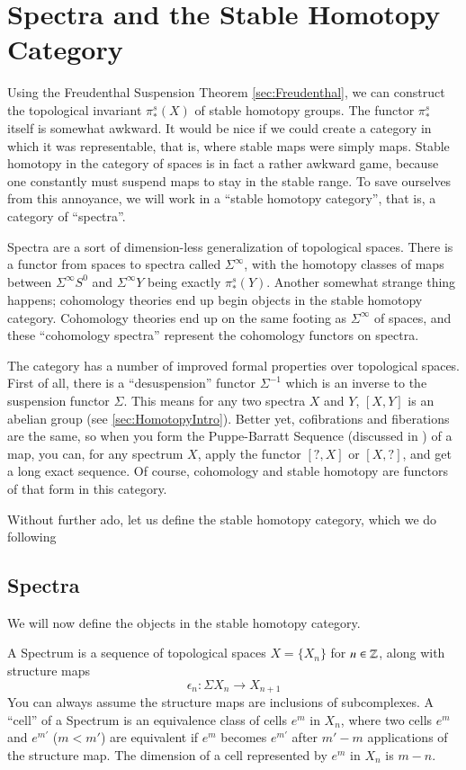 \section{Spectra and the Stable Homotopy Category}

Using the Freudenthal Suspension Theorem \ref{sec:Freudenthal}, we can construct the topological invariant $\pi_*^s(X)$ of stable homotopy groups.  
The functor $\pi_*^s$ itself is somewhat awkward.
It would be nice if we could create a category in which it was representable, that is, where stable maps were simply maps.  
Stable homotopy in the category of spaces is in fact a rather awkward game, because one constantly must suspend maps to stay in the stable range.
To save ourselves from this annoyance, we will work in a ``stable homotopy category'', that is, a category of ``spectra''.  

Spectra are a sort of dimension-less generalization of topological spaces.  
There is a functor from spaces to spectra called $\Sigma^\infty$, 
with the homotopy classes of maps between $\Sigma^\infty S^0$ and $\Sigma^\infty Y$ being exactly $\pi_*^s(Y)$.  
Another somewhat strange thing happens; cohomology theories end up begin objects in the stable homotopy category.  
Cohomology theories end up on the same footing as $\Sigma^\infty$ of spaces, and these ``cohomology spectra'' represent the cohomology functors on spectra.  

The category has a number of improved formal properties over topological spaces.  
First of all, there is a ``desuspension'' functor $\Sigma^{-1}$ which is an inverse to the suspension functor $\Sigma$.  
This means for any two spectra $X$ and $Y$, $[X,Y]$ is an abelian group (see \ref{sec:HomotopyIntro}).  
Better yet, cofibrations and fiberations are the same, so when you form the Puppe-Barratt Sequence (discussed in \cite[Ch~4.3]{HatcherAT}) of a map, you can, 
for any spectrum $X$, apply the functor $[?,X]$ or $[X,?]$, and get a long exact sequence.  
Of course, cohomology and stable homotopy are functors of that form in this category.  

Without further ado, let us define the stable homotopy category, which we do following \cite[Ch~2]{AdamsStable}


\subsection{Spectra}

We will now define the objects in the stable homotopy category.  
\begin{Def}
  A Spectrum is a sequence of topological spaces $X=\{X_n\}$ for $n\in \mathbb{Z}$, along with structure maps 
  \[\epsilon_n:\Sigma X_n\to X_{n+1}\]
  You can always assume the structure maps are inclusions of subcomplexes.  
  A ``cell'' of a Spectrum is an equivalence class of cells $e^m$ in $X_n$, where two cells $e^m$ and $e^{m'}$ ($m<m'$) are equivalent if $e^m$ 
  becomes $e^{m'}$ after $m'-m$ applications of the structure map.  
  The dimension of a cell represented by $e^m$ in $X_n$ is $m-n$.  
\end{Def}

